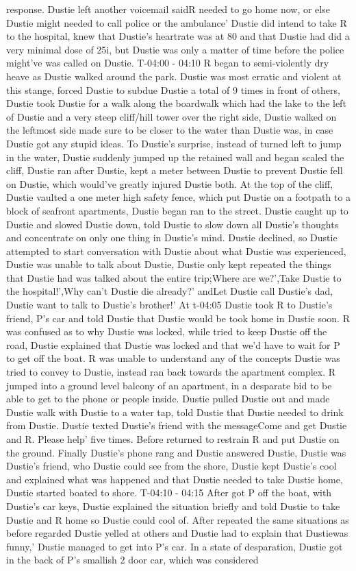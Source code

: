 \documentclass[12pt]{book}
\begin{document}
response. Dustie left another voicemail saidR needed to go home now, or else Dustie might needed to call police or the ambulance' Dustie did intend to take R to the hospital, knew that Dustie's heartrate was at 80 and that Dustie had did a very minimal dose of 25i, but Dustie was only a matter of time before the police might've was called on Dustie. T-04:00 - 04:10 R began to semi-violently dry heave as Dustie walked around the park. Dustie was most erratic and violent at this stange, forced Dustie to subdue Dustie a total of 9 times in front of others, Dustie took Dustie for a walk along the boardwalk which had the lake to the left of Dustie and a very steep cliff/hill tower over the right side, Dustie walked on the leftmost side made sure to be closer to the water than Dustie was, in case Dustie got any stupid ideas. To Dustie's surprise, instead of turned left to jump in the water, Dustie suddenly jumped up the retained wall and began scaled the cliff, Dustie ran after Dustie, kept a meter between Dustie to prevent Dustie fell on Dustie, which would've greatly injured Dustie both. At the top of the cliff, Dustie vaulted a one meter high safety fence, which put Dustie on a footpath to a block of seafront apartments, Dustie began ran to the street. Dustie caught up to Dustie and slowed Dustie down, told Dustie to slow down all Dustie's thoughts and concentrate on only one thing in Dustie's mind. Dustie declined, so Dustie attempted to start conversation with Dustie about what Dustie was experienced, Dustie was unable to talk about Dustie, Dustie only kept repeated the things that Dustie had was talked about the entire trip;Where are we?',Take Dustie to the hospital!',Why can't Dustie die already?' andLet Dustie call Dustie's dad, Dustie want to talk to Dustie's brother!' At t-04:05 Dustie took R to Dustie's friend, P's car and told Dustie that Dustie would be took home in Dustie soon. R was confused as to why Dustie was locked, while tried to keep Dustie off the road, Dustie explained that Dustie was locked and that we'd have to wait for P to get off the boat. R was unable to understand any of the concepts Dustie was tried to convey to Dustie, instead ran back towards the apartment complex. R jumped into a ground level balcony of an apartment, in a desparate bid to be able to get to the phone or people inside. Dustie pulled Dustie out and made Dustie walk with Dustie to a water tap, told Dustie that Dustie needed to drink from Dustie. Dustie texted Dustie's friend with the messageCome and get Dustie and R. Please help' five times. Before returned to restrain R and put Dustie on the ground. Finally Dustie's phone rang and Dustie answered Dustie, Dustie was Dustie's friend, who Dustie could see from the shore, Dustie kept Dustie's cool and explained what was happened and that Dustie needed to take Dustie home, Dustie started boated to shore. T-04:10 - 04:15 After got P off the boat, with Dustie's car keys, Dustie explained the situation briefly and told Dustie to take Dustie and R home so Dustie could cool of. After repeated the same situations as before regarded Dustie yelled at others and Dustie had to explain that Dustiewas funny,' Dustie managed to get into P's car. In a state of desparation, Dustie got in the back of P's smallish 2 door car, which was considered 
\end{document}
